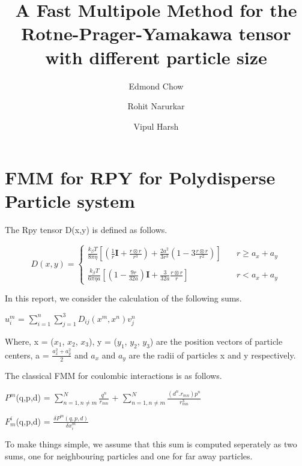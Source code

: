 \documentclass[a4paper,9pt]{report}
\title{A Fast Multipole Method for the Rotne-Prager-Yamakawa tensor with different particle size}
\author{Edmond Chow \and Rohit Narurkar \and Vipul Harsh\\[0.3 cm]}
\begin{document}
\maketitle



\section*{FMM for RPY for Polydisperse Particle system}
The Rpy tensor D(x,y) is defined as follows.
\begin{center}
  $$
D(x,y) = \left\{
        \begin{array}{ll}
            \frac{k_{\beta}T}{8\pi\eta}[(\frac{1}{r}\textbf{I} + \frac{r\otimes r}{r^{3}}) + \frac{2a^{2}}{3r^{3}}(1-3\frac{r\otimes r}{r^{2}})]   & \quad r \geq a_{x}+a_{y} \\
            \\
            \frac{k_{\beta}T}{6\pi\eta a}[(1 - \frac{9r}{32a})\textbf{I} + \frac{3}{32a} \frac{r\otimes r}{r}] & \quad r < a_{x}+a_{y}
        \end{array}
    \right.
$$
\end{center}

In this report, we consider the calculation of the following sums.

\begin{center}
  $u^{m}_{i}$ = $\sum\limits_{i=1}^n \sum\limits_{j=1}^3 D_{ij}(x^{m}, x^{n})v^{n}_{j}$   
\end{center}
  Where, 
   x = ($x_{1}$, $x_{2}$, $x_{3}$),  y = ($y_{1}$, $y_{2}$, $y_{3}$) are the position vectors of particle centers,
   a = $\frac{a_{x}^{2} + a_{y}^{2}}{2}$ \newline
    and $a_{x}$ and $a_{y}$ are the radii of particles x and y respectively.

\vskip 1cm   
   
   
 The classical FMM for coulombic interactions is as follows.  
\begin{center}
$P^{m}$(q,p,d) = $\sum\limits_{n=1, n\neq m}^N \frac{q^{n}}{r_{mn}}$ + 
			   $\sum\limits_{n=1, n\neq m}^N \frac{(d^{n} . r_{mn})p^{n}}{r_{mn}^{3}}$

\vskip 1cm

$F_{m}^{i}$(q,p,d) = $\frac{\delta P^{m}(q,p,d)}{\delta x_{i}^{m}}$
\end{center}


To make things simple, we assume that this sum is computed seperately as two sums, one for neighbouring particles and one for far away particles. 
\end{document}
